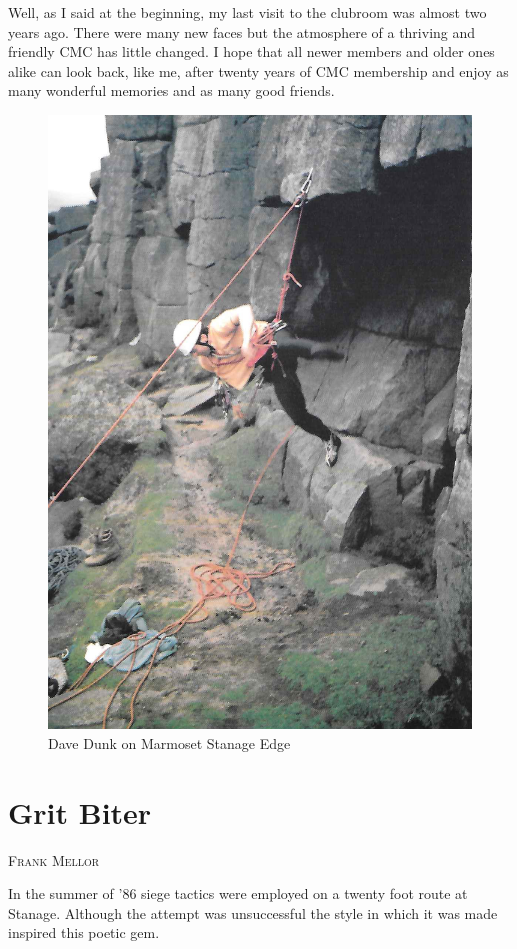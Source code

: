 \documentclass[a5paper,openany,font 10pt]{scrbook}
\makeatletter
\newcommand{\chapterauthor}[1]{%
{\parindent0pt\vspace*{-5pt}%
\linespread{1.1}\large\scshape#1%
\par\nobreak\vspace*{35pt}}
\@afterheading%
}
\makeatother
\begin{document}
Well, as I said at the beginning, my last visit to the
clubroom was almost two years ago. There were many new faces but
the atmosphere of a thriving and friendly CMC has little changed.
I hope that all newer members and older ones alike can look back,
like me, after twenty years of CMC membership and enjoy as many
wonderful memories and as many good friends.
\begin{figure}[htb]
\centering
\includegraphics[width=.9\linewidth]{./images/Dave_Dunk_on_Marmoset_Stanage_Edge.jpg}
\caption{\label{fig:org71fc003}
Dave Dunk on Marmoset Stanage Edge}
\end{figure}

\chapter{Grit Biter}
\label{sec:org876111d}
\chapterauthor{Frank Mellor}


In the summer of '86 siege tactics were employed on a
twenty foot route at Stanage. Although the attempt was
unsuccessful the style in which it was made inspired this poetic
gem.
\end{document}
